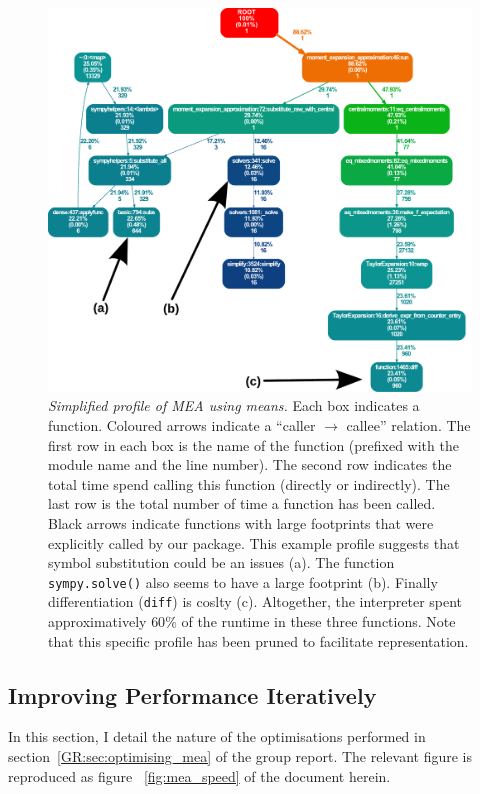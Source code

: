 \begin{figure}[tbh]
\label{fig:profiled}
\includegraphics[width=0.83\textwidth{}]{profile.pdf}
\caption{\emph{Simplified profile of MEA using means.}
 Each box indicates a function.
 Coloured arrows indicate a ``caller $ \rightarrow $ callee'' relation.
 The first row in each box is the name of the function (prefixed with the module name and the line number).
 The second row indicates the total time spend calling this function (directly or indirectly).
 The last row is the total number of time a function has been called.
 Black arrows indicate \sympy{} functions with large footprints that were explicitly called by our package.
 This example profile suggests that symbol substitution could be an issues (a).
 The function \texttt{sympy.solve()} also seems to have a large footprint (b).
 Finally differentiation (\texttt{diff}) is coslty (c).
 Altogether, the interpreter spent approximatively $60\%$
 of the runtime in these three functions.
 Note that this specific profile has been pruned to facilitate representation.
}

\end{figure}


\subsection{Improving Performance Iteratively}
In this section, I detail the nature of the optimisations performed in section~\ref*{GR:sec:optimising_mea} of the group report.
The relevant figure is reproduced as figure ~\ref{fig:mea_speed} of the document herein.

